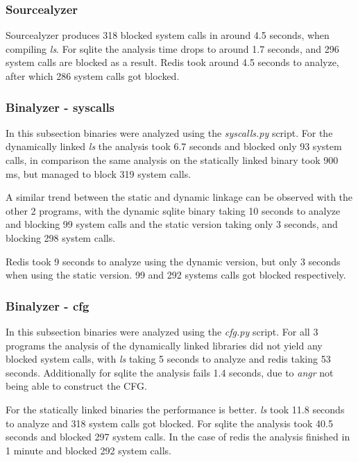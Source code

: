 \subsubsection {Sourcealyzer}
Sourcealyzer produces 318 blocked system calls in around 4.5 seconds, when compiling \textit{ls}.
For sqlite the analysis time drops to around 1.7 seconds, and 296 system calls are blocked as a result.
Redis took around 4.5 seconds to analyze, after which 286 system calls got blocked.

\subsubsection {Binalyzer - syscalls}
In this subsection binaries were analyzed using the \textit{syscalls.py} script.
For the dynamically linked \textit{ls} the analysis took 6.7 seconds and blocked only 93 system calls, in comparison the same analysis on the statically linked binary took 900 ms, but managed to block 319 system calls.

A similar trend between the static and dynamic linkage can be observed with the other 2 programs, with the dynamic sqlite binary taking 10 seconds to analyze and blocking 99 system calls and the static version taking only 3 seconds, and blocking 298 system calls.

Redis took 9 seconds to analyze using the dynamic version, but only 3 seconds when using the static version. 99 and 292 systems calls got blocked respectively.

\subsubsection {Binalyzer - cfg}
In this subsection binaries were analyzed using the \textit{cfg.py} script.
For all 3 programs the analysis of the dynamically linked libraries did not yield any blocked system calls, with \textit{ls} taking 5 seconds to analyze and redis taking 53 seconds. Additionally for sqlite the analysis fails 1.4 seconds, due to \textit{angr} not being able to construct the CFG.

For the statically linked binaries the performance is better.
\textit{ls} took 11.8 seconds to analyze and 318 system calls got blocked.
For sqlite the analysis took 40.5 seconds and blocked 297 system calls.
In the case of redis the analysis finished in 1 minute and blocked 292 system calls.
